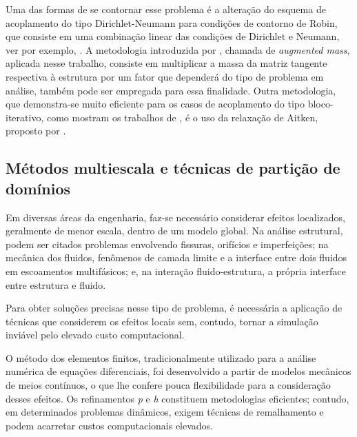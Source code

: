 Uma das formas de se contornar esse problema é a alteração do esquema de acoplamento do tipo Dirichlet-Neumann para condições de contorno de Robin, que consiste em uma combinação linear das condições de Dirichlet e Neumann, ver por exemplo, . A metodologia introduzida por , chamada de \textit{augmented mass}, aplicada nesse trabalho, consiste em multiplicar a massa da matriz tangente respectiva à estrutura por um fator que dependerá do tipo de problema em análise, também pode ser empregada para essa finalidade. Outra metodologia, que demonstra-se muito eficiente para os casos de acoplamento do tipo bloco-iterativo, como mostram os trabalhos de \cite{FernandesCS:2019,KuttlerW:2008}, é o uso da relaxação de Aitken, proposto por .

\subsection{Métodos multiescala e técnicas de partição de domínios}
\label{arlequinsection}

Em diversas áreas da engenharia, faz-se necessário considerar efeitos localizados, geralmente de menor escala, dentro de um modelo global. Na análise estrutural, podem ser citados problemas envolvendo fissuras, orifícios e imperfeições; na mecânica dos fluidos, fenômenos de camada limite e a interface entre dois fluidos em escoamentos multifásicos; e, na interação fluido-estrutura, a própria interface entre estrutura e fluido.

Para obter soluções precisas nesse tipo de problema, é necessária a aplicação de técnicas que considerem os efeitos locais sem, contudo, tornar a simulação inviável pelo elevado custo computacional.

O método dos elementos finitos, tradicionalmente utilizado para a análise numérica de equações diferenciais, foi desenvolvido a partir de modelos mecânicos de meios contínuos, o que lhe confere pouca flexibilidade para a consideração desses efeitos. Os refinamentos \textit{p} e \textit{h} constituem metodologias eficientes; contudo, em determinados problemas dinâmicos, exigem técnicas de remalhamento e podem acarretar custos computacionais elevados.


